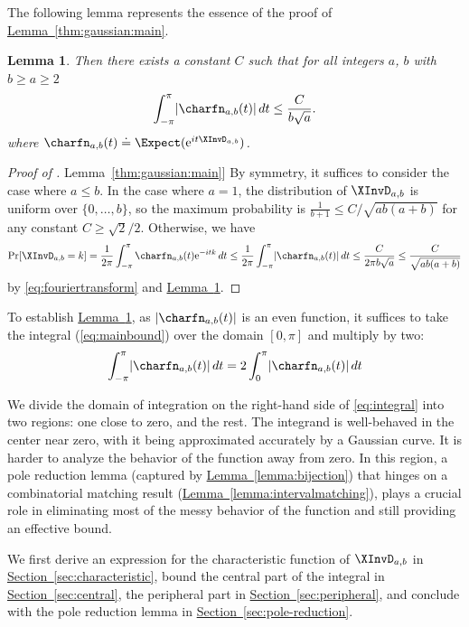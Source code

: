 \documentclass[11pt]{article}
\numberwithin{equation}{section}
\newtheorem{lemma}[theorem]{Lemma}
\theoremstyle{definition}
\theoremstyle{plain}
\newcommand{\eee}{\mathrm e}
\newcommand{\expref}[2]{\hyperref[#2]{#1~\ref{#2}}}
\begin{document}
The following lemma represents the essence of the proof of 
 \expref{Lemma}{thm:gaussian:main}.
\begin{lemma}
    \label{thm:integral}
    Then there exists a constant $C$ such that for all integers $a$, $b$ with $b \ge a \ge 2$
      \begin{equation}
        \label{eq:mainbound}
        \int_{-\pi}^{\pi} \lvert \charfn_{a,b}(t)\rvert\,dt \le \frac{C}{b\sqrt{a}}.
    \end{equation}  
where $\charfn_{a,b}(t) \doteq \Expect(\eee^{it\XInvD_{a,b}})$. 
\end{lemma}
\begin{proof}[Proof of \expref{Lemma}{thm:gaussian:main}]
By symmetry, it suffices to consider the case where $a \le b$. In the case where $a=1$, the distribution of $\XInvD_{a,b}$ is uniform over $\{0,\dots,b\}$, so the maximum probability is $\frac{1}{b+1} \le C/\sqrt{ab(a+b)}$ for any constant $C \ge \sqrt{2}/2$. Otherwise, 
we have
\[ \Pr[\XInvD_{a,b}=k] = \frac{1}{2\pi} \int_{-\pi}^{\pi}\charfn_{a,b}(t)\eee^{-itk}\,dt \le \frac{1}{2\pi} \int_{-\pi}^{\pi} \lvert\charfn_{a,b}(t)\rvert\,dt \le \frac{C}{2\pi b\sqrt{a}} \le \frac{C}{\sqrt{ab(a+b)}} \]
by \eqref{eq:fouriertransform} and \expref{Lemma}{thm:integral}.
\end{proof}

To establish \expref{Lemma}{thm:integral}, as $\lvert \charfn_{a,b}(t) \rvert$ is an even function, it suffices to take the integral (\ref{eq:mainbound}) over the domain $[0,\pi]$ and multiply by two: 
\begin{equation}
    \label{eq:integral}
    \int_{-\pi}^{\pi} \lvert \charfn_{a,b}(t)\rvert\,dt 
    = 2 \int_0^{\pi} \lvert \charfn_{a,b}(t)\rvert\,dt 
\end{equation}  

We divide the domain of integration on the right-hand side of \eqref{eq:integral} into two regions: one close to zero, and the rest. The integrand is well-behaved in the center near zero, with it being approximated accurately by a Gaussian curve. It is harder to analyze the behavior of the function away from zero. In this region, a pole reduction lemma (captured by \expref{Lemma}{lemma:bijection}) that hinges on a combinatorial matching result (\expref{Lemma}{lemma:intervalmatching}), plays a crucial role in eliminating most of the messy behavior of the function and still providing an effective bound.

We first derive an expression for the characteristic function of $\XInvD_{a,b}$ in \expref{Section}{sec:characteristic}, bound the central part of the integral in \expref{Section}{sec:central}, the peripheral part in \expref{Section}{sec:peripheral}, and conclude with the pole reduction lemma in \expref{Section}{sec:pole-reduction}.
\end{document}
